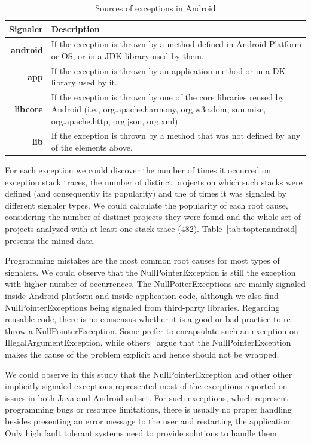 \documentclass[conference]{IEEEtran}
\begin{document}
\begin{table}
  \centering
  \begin{tabular}{rp{29em}}
    \hline
    \bfseries{Signaler} & \bfseries{Description} \\
    \hline
    \bfseries{android} & If the exception is thrown by a method defined in Android Platform or OS, or in a JDK library used by them.\\
    \bfseries{app}     & If the exception is thrown by an application method or in a  DK library used by it.\\
    \bfseries{libcore} & If the exception is thrown by one of the core libraries reused by Android (i.e., org.apache.harmony, org.w3c.dom, sun.misc, org.apache.http, org.json, org.xml). \\
    \bfseries{lib}     & If the exception is thrown by a method that was not defined by any of the elements above.\\
    \hline
  \end{tabular}
  \caption{Sources of exceptions in Android}
  \label{tab:signalers}
\end{table}

For each exception we could discover the number of times it occurred on exception stack traces,
the number of distinct projects on which such stacks were defined (and consequently its
popularity) and the of times it was signaled by different signaler types. We
could calculate the popularity of each root cause, considering the number of
distinct projects they were found and the whole set of projects analyzed with at
least one stack trace (482). Table~\ref{tab:toptenandroid} 
presents the mined data.



Programming mistakes are the most common root causes for most types of signalers. We
could observe that the NullPointerException is still the exception with higher
number of occurrences. The NullPoiterExceptions are mainly signaled inside
Android platform and inside application code, although we also find
NullPointerExceptions being signaled from third-party libraries. Regarding
reusable code, there is no consensus whether it is a good or bad practice to 
re-throw
a NullPointerException. Some prefer to encapsulate such an exception on
IllegalArgumentException, while others~\cite{bloch2008effective} argue that the
NullPointerException makes the cause of the problem explicit and hence 
should not be wrapped.

We could observe in this study that the NullPointerException and other
other implicitly signaled exceptions represented most of the exceptions reported
on issues in both Java and Android subset. For such exceptions, which represent
programming bugs or resource limitations, there is usually no proper handling
besides presenting an error message to the user and restarting the application.
Only high fault tolerant systems need to provide solutions to handle them.
\end{document}

